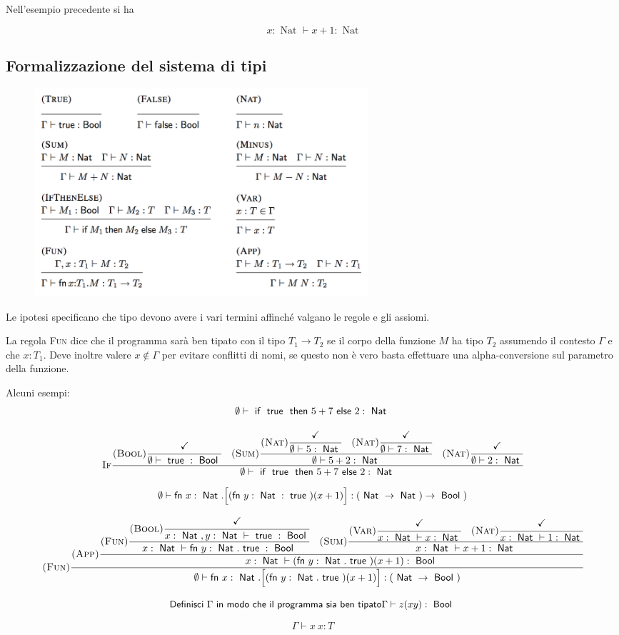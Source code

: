 Nell'esempio precedente si ha

$$
x : \text{ Nat } \vdash x + 1 : \text{ Nat}
$$

\subsection{Formalizzazione del sistema di tipi}

\begin{figure}[htbp]
	\centering
	\includegraphics[width=0.6\textwidth]{images/l4-assiomi}
\end{figure}

Le ipotesi specificano che tipo devono avere i vari termini affinché valgano le regole e gli assiomi.

La regola \textsc{Fun} dice che il programma sarà ben tipato con il tipo $T_1 \rightarrow T_2$ se il corpo della funzione $M$ ha tipo $T_2$ assumendo il contesto $\Gamma$ e che $x : T_1$. Deve inoltre valere $x \not\in \Gamma$ per evitare conflitti di nomi, se questo non è vero basta effettuare una alpha-conversione sul parametro della funzione.

Alcuni esempi:
$$
	\emptyset \vdash \iif \true \then 5+7 \eelse 2 : \Nat
$$


$$
\textsc{If} \cfrac{
	\textsc{(Bool)}\cfrac{
		\checkmark
	}{
		\emptyset \vdash \true : \Bool	
	} \quad
	\textsc{(Sum)}\cfrac{
		\textsc{(Nat)}\cfrac{
			\checkmark
		}{
			\emptyset \vdash 5 : \Nat
		} \quad
		\textsc{(Nat)}\cfrac{
			\checkmark
		}{
			\emptyset \vdash 7: \Nat  
		}
	}{
		\emptyset \vdash 5+2 : \Nat   
	} \quad 
	\textsc{(Nat)}\cfrac{
		\checkmark
	}{
		\emptyset \vdash 2 : \Nat
	}
}{
	\emptyset \vdash \iif \true \then 5+7 \eelse 2 : \Nat
}
$$

$$
\emptyset \vdash \fn x : \Nat.\Big[ (\fn y : \Nat : \true) (x +1)\Big] : (\Nat \rightarrow \Nat) \rightarrow \Bool)
$$

$$
\textsc{(Fun)} \cfrac{
	\textsc{(App)} \cfrac{
		\textsc{(Fun)}\cfrac{
			\textsc{(Bool)} \cfrac{\checkmark}{
				x:\Nat, y:\Nat \vdash \true : \Bool 
			}
		}{
			x : \Nat \vdash \fn y : \Nat . \true :\Bool 
		} \quad
		\textsc{(Sum)} \cfrac{
			\textsc{(Var)} \cfrac{
				\checkmark
			}{
				 x:\Nat \vdash x: \Nat
			} \quad 
			\textsc{(Nat)} \cfrac{
				\checkmark
			}{
				x:\Nat \vdash 1: \Nat
			}
		}{
			x: \Nat \vdash x+1 : \Nat 
		}
	}{
		x : \Nat \vdash (\fn y : \Nat . \true) (x +1) : \Bool
	}
}{
\emptyset \vdash \fn x : \Nat.\Big[ (\fn y : \Nat . \true) (x +1)\Big] : (\Nat \rightarrow \Bool)
}
$$



$$
\text{Definisci }\Gamma \text{ in modo che il programma sia ben tipato}\Gamma \vdash z (x y) : \Bool
$$

$$
\Gamma \vdash x \: x : T
$$
